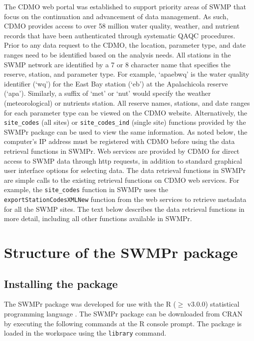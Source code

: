 The CDMO web portal was established to support priority areas of SWMP that focus on the continuation and advancement of data management.  As such, CDMO provides access to over 58 million water quality, weather, and nutrient records that have been authenticated through systematic QAQC procedures.    Prior to any data request to the CDMO, the location, parameter type, and date ranges need to be identified based on the analysis needs. All stations in the SWMP network are identified by a 7 or 8 character name that specifies the reserve, station, and parameter type.  For example, `apaebwq' is the water quality identifier (`wq') for the East Bay station (`eb') at the Apalachicola reserve (`apa').  Similarly, a suffix of `met' or `nut' would specify the weather (meteorological) or nutrients station.  All reserve names, stations, and date ranges for each parameter type can be viewed on the CDMO website. Alternatively, the \texttt{site\_codes} (all sites) or \texttt{site\_codes\_ind} (single site) functions provided by the SWMPr package can be used to view the same information.  As noted below, the computer's IP address must be registered with CDMO before using the data retrieval functions in SWMPr.  Web services are provided by CDMO for direct access to SWMP data through http requests, in addition to standard graphical user interface options for selecting data.  The data retrieval functions in SWMPr are simple calls to the existing retrieval functions on CDMO web services.  For example, the \texttt{site\_codes} function in SWMPr uses the \texttt{exportStationCodesXMLNew} function from the web services to retrieve metadata for all the SWMP sites.  The text below describes the data retrieval functions in more detail, including all other functions available in SWMPr.

\section{Structure of the SWMPr package}

\subsection{Installing the package}

The SWMPr package was developed for use with the R ($\geq$ v3.0.0) statistical programming language \cite{RDCT14}. The SWMPr package can be downloaded from CRAN by executing the following commands at the R console prompt.  The package is loaded in the workspace using the \texttt{library} command.

